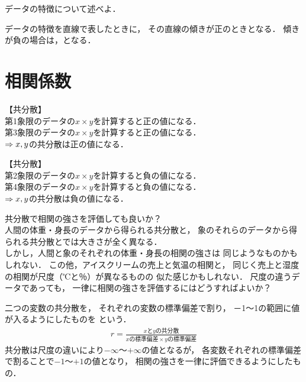 \MyFrame{\insertsection}
{
}

\MyFrame{\insertsection}
{
}

\MyFrame{\insertsection}
{
  \MyProblem
  {
    データの特徴について述べよ．
  }
}

\MyFrame{\insertsection}
{
  \MySolution
  {
    {
      データの特徴を直線で表したときに，
      その直線の傾きが正のときとなる．
      傾きが負の場合は，となる．
    }
  }
}

\section{相関係数}

{
  【共分散】\\
  第1象限のデータの$x\times y$を計算すると正の値になる．\\
  第3象限のデータの$x\times y$を計算すると正の値になる．\\
  $\Rightarrow x,y$の共分散は正の値になる．
}

{
  【共分散】\\
  第2象限のデータの$x\times y$を計算すると負の値になる．\\
  第4象限のデータの$x\times y$を計算すると負の値になる．\\
  $\Rightarrow x,y$の共分散は負の値になる．
}

{
  共分散で相関の強さを評価しても良いか？\\
  人間の体重・身長のデータから得られる共分散と，
  象のそれらのデータから得られる共分散とでは大きさが全く異なる．\\
  しかし，人間と象のそれぞれの体重・身長の相関の強さは
  同じようなものかもしれない．
  この他，アイスクリームの売上と気温の相関と，
  同じく売上と湿度の相関が尺度（℃と％）が異なるものの
  似た感じかもしれない．
  尺度の違うデータであっても，
  一律に相関の強さを評価するにはどうすればよいか？
}

{
  {
    二つの変数の共分散を，
    それぞれの変数の標準偏差で割り，
    －1～1の範囲に値が入るようにしたものを
    という．
    \begin{align*}
      r = \frac{xとyの共分散}{xの標準偏差\times yの標準偏差}
    \end{align*}
  }
  共分散は尺度の違いにより$-\infty$〜$+\infty$の値となるが，
  各変数それぞれの標準偏差で割ることで$-1$〜$+1$の値となり，
  相関の強さを一律に評価できるようにしたもの．
}

